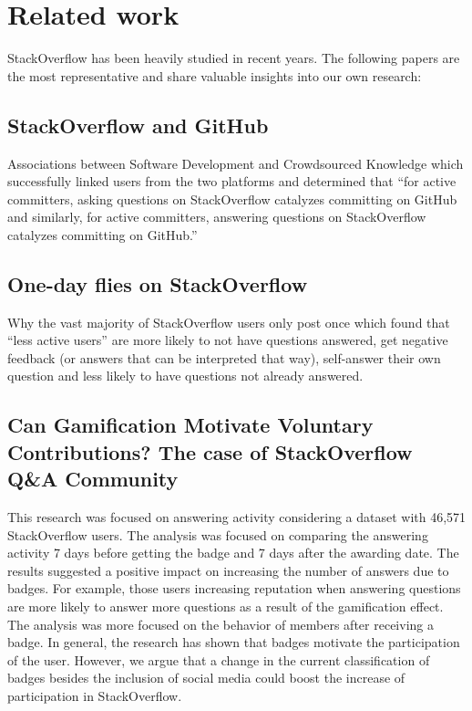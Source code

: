 \documentclass{sigchi}
\begin{document}
\section{Related work}
StackOverflow has been heavily studied in recent years. The following papers
are the most representative and share valuable insights into our own research:

\subsection{StackOverflow and GitHub}

Associations between Software Development and Crowdsourced Knowledge which
successfully linked users from the two platforms and determined that “for
active committers, asking questions on StackOverflow catalyzes committing on
GitHub and similarly, for active committers, answering questions on
StackOverflow catalyzes committing on GitHub.”

\subsection{One-day flies on StackOverflow}

Why the vast majority of StackOverflow users only post once which found that
“less active users” are more likely to not have questions answered, get
negative feedback (or answers that can be interpreted that way), self-answer
their own question and less likely to have questions not already answered.

\subsection{Can Gamification Motivate Voluntary Contributions? The case of
StackOverflow Q\&A Community}

This research was focused on answering activity considering a dataset with
46,571 StackOverflow users. The analysis was focused on comparing the answering
activity 7 days before getting the badge and 7 days after the awarding date.
The results suggested a positive impact on increasing the number of answers due
to badges. For example, those users increasing reputation when answering
questions are more likely to answer more questions as a result of the
gamification effect. The analysis was more focused on the behavior of members after
receiving a badge. In general, the research has shown that badges motivate
the participation of the user. However, we argue that a change in the current
classification of badges besides the inclusion of social media could boost the
increase of participation in StackOverflow.
\end{document}
